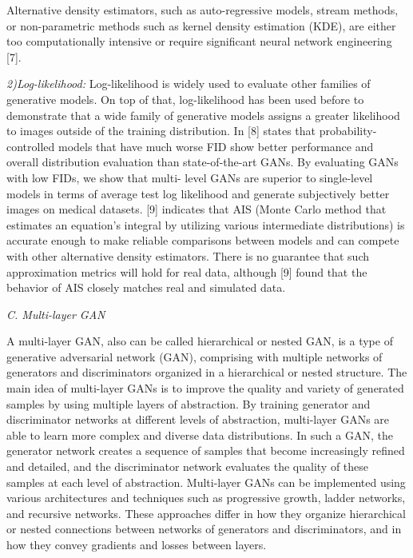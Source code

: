 \documentclass[10pt, a4paper]{article}
\begin{document}
\begin{multicols}{2}
Alternative density estimators, such as auto-regressive models, stream methods, or non-parametric methods such as kernel density estimation (KDE), are either too
computationally intensive or require significant neural network engineering [7].

\textit{2)Log-likelihood:}  Log-likelihood is widely used to evaluate other families of generative models. On top of that, log-likelihood has been used before to demonstrate that a wide family of generative models assigns a greater likelihood to images outside of the training distribution. In [8] states that probability-controlled models that have much worse FID show better performance and overall distribution evaluation than state-of-the-art GANs. By evaluating GANs with low FIDs, we show that multi- level GANs are superior to single-level models in terms of average test log likelihood and generate subjectively better images on medical datasets. [9] indicates that AIS (Monte Carlo method that estimates an equation’s integral by utilizing various intermediate distributions) is accurate enough to make reliable comparisons between models and can compete with other alternative density estimators. There is no guarantee that such approximation metrics will hold for real data, although [9] found that the behavior of AIS closely matches real and simulated data.

\vspace{0.5cm}
\noindent
\textit{C. Multi-layer GAN} 
\vspace{0.2cm}
\par
A multi-layer GAN, also can be called hierarchical or nested GAN, is a type of generative adversarial network (GAN), comprising with multiple networks of generators and discriminators organized in a hierarchical or nested structure. The main idea of multi-layer GANs is to improve the quality and variety of generated samples by using multiple layers of abstraction. By training generator and discriminator networks at different levels of abstraction, multi-layer GANs are able to learn more complex and diverse data distributions. In such a GAN, the generator network creates a sequence of samples that become increasingly refined and detailed, and the discriminator network evaluates the quality of these samples at each level of abstraction. Multi-layer GANs can be implemented using various architectures and techniques such as progressive growth, ladder networks, and recursive networks. These approaches differ in how they organize hierarchical or nested connections between networks of generators and discriminators, and in how they convey gradients and losses between layers.

\end{multicols}
\end{document}
